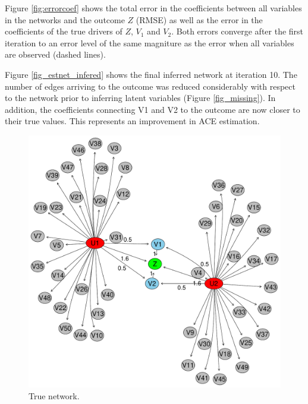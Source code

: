 \documentclass{article}
\begin{document}
Figure \ref{fig:errorcoef} shows the total error in the coefficients
between all variables in the networks and the outcome $Z$ (RMSE) as
well as the error in the coefficients of the true drivers of $Z$, $V_1$
and $V_2$. Both errors converge after the first iteration to an error
level of the same magniture as the error when all variables are
observed (dashed lines).


Figure \ref{fig_estnet_infered} shows the final inferred network at iteration 10. The number of edges arriving to the outcome was reduced considerably with respect to the network prior to inferring latent variables (Figure \ref{fig_missing}). In addition, the coefficients connecting V1 and V2 to the outcome are now closer to their true values. This represents an improvement in ACE estimation.

\begin{figure}[ht!]
  \centering
  \begin{minipage}[t]{0.29\linewidth}
    \includegraphics[width=\linewidth]{./images/true_network.pdf}
    \caption{\label{fig_truenet}True network. }
  \end{minipage}\hfill
   \begin{minipage}[t]{0.33\linewidth}

\end{minipage}
\end{figure}
\end{document}
